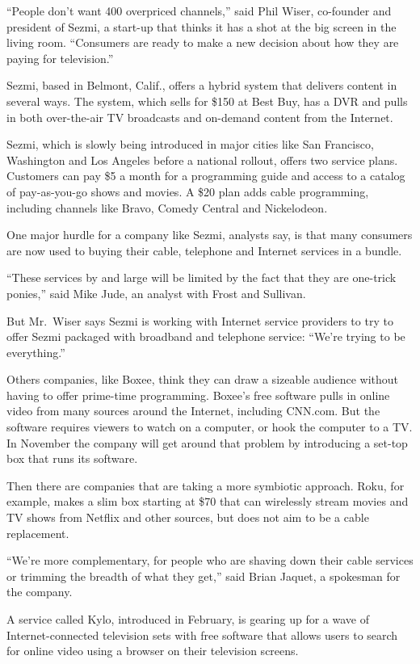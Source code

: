 ﻿\documentclass[12pt]{article}
\begin{document}
``People don't want 400 overpriced channels,'' said Phil Wiser, co-founder and president of Sezmi, a
start-up that thinks it has a shot at the big screen in the living room. ``Consumers are ready to
make a new decision about how they are paying for television.''

Sezmi, based in Belmont, Calif., offers a hybrid system that delivers content in several ways. The
system, which sells for \$150 at Best Buy, has a DVR and pulls in both over-the-air TV broadcasts
and on-demand content from the Internet.

Sezmi, which is slowly being introduced in major cities like San Francisco, Washington and Los
Angeles before a national rollout, offers two service plans. Customers can pay \$5 a month for a
programming guide and access to a catalog of pay-as-you-go shows and movies. A \$20 plan adds cable
programming, including channels like Bravo, Comedy Central and Nickelodeon.

One major hurdle for a company like Sezmi, analysts say, is that many consumers are now used to
buying their cable, telephone and Internet services in a bundle.

``These services by and large will be limited by the fact that they are one-trick ponies,'' said
Mike Jude, an analyst with Frost and Sullivan.

But Mr.~Wiser says Sezmi is working with Internet service providers to try to offer Sezmi packaged
with broadband and telephone service: ``We're trying to be everything.''

Others companies, like Boxee, think they can draw a sizeable audience without having to offer
prime-time programming. Boxee's free software pulls in online video from many sources around the
Internet, including CNN.com. But the software requires viewers to watch on a computer, or hook the
computer to a TV. In November the company will get around that problem by introducing a set-top box
that runs its software.

Then there are companies that are taking a more symbiotic approach. Roku, for example, makes a slim
box starting at \$70 that can wirelessly stream movies and TV shows from Netflix and other sources,
but does not aim to be a cable replacement.

``We're more complementary, for people who are shaving down their cable services or trimming the
breadth of what they get,'' said Brian Jaquet, a spokesman for the company.

A service called Kylo, introduced in February, is gearing up for a wave of Internet-connected
television sets with free software that allows users to search for online video using a browser on
their television screens.
\end{document}
